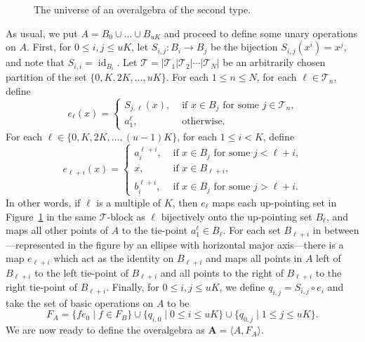 \documentclass{au}
\numberwithin{equation}{section}
\theoremstyle{plain}
\theoremstyle{definition}
\newcommand{\suchthat}{\ensuremath{\mid}}  %
\newcommand{\defeq}{\ensuremath{=}}        %
\newcommand{\<}{\ensuremath{\langle}}
\renewcommand{\>}{\ensuremath{\rangle}}
\newcommand{\bA}{\ensuremath{\mathbf{A}}}
\newcommand{\sT}{\ensuremath{\mathscr{T}}}
\DeclareMathOperator{\id}{id}
\newcommand{\supi}{\ensuremath{^{i}}}
\newcommand{\supj}{\ensuremath{^{j}}}
\renewcommand{\leq}{\ensuremath{\leqslant}}
\begin{document}
\begin{figure}[h!]
{
}
  \caption{The universe of an overalgebra of the second type.}
\label{fig:OveralgebrasIII}
\end{figure}

As usual, we put $A\defeq B_0\cup \dots\cup B_{uK}$ and proceed to define
some unary operations on $A$.
First, for $0\leq i, j \leq uK$, let $S_{i,j}\colon B_i \rightarrow B_j $ be the
bijection $S_{i,j}(x\supi)=x\supj$, and note that $S_{i,i} = \id_{B_i}$.
Let $\sT = |\sT_1|\sT_2| \cdots|\sT_N|$ be an arbitrarily chosen partition of the set
$\{0, K, 2K, \dots, uK\}$.  For each $1\leq n \leq N$, for each $\ell \in \sT_n$, define
\[
e_{\ell}(x)=
\begin{cases}
S_{j,\ell}(x), &\text{ if $x\in B_{j}$ for some $j \in \sT_n$,}\\
a^{\ell}_1, &\text{ otherwise.}
\end{cases}
\]
For each
 $\ell \in \{0, K, 2K, \dots, (u-1)K\}$, for each
$1\leq i < K$, define
\[
e_{\ell+i}(x)=
\begin{cases}
a_i^{\ell+i}, &\text{ if $x\in B_{j}$ for some $j < \ell+i$,}\\
x, &\text{ if $x\in B_{\ell+i}$,}\\
b_i^{\ell+i}, &\text{ if $x\in B_{j}$ for some $j > \ell+i$.}
\end{cases}
\]
In other words, if $\ell$ is a multiple of $K$, then $e_{\ell}$ maps each up-pointing set in
Figure~\ref{fig:OveralgebrasIII} in the same $\sT$-block  as $\ell$
bijectively onto the up-pointing set $B_{\ell}$, and maps all other points of $A$ to the tie-point
$a^{\ell}_1\in B_{\ell}$.
For each set $B_{\ell+i}$ in between---represented in the
figure by an ellipse with horizontal major axis---there is a map
$e_{\ell+i}$ which act as the identity on $B_{\ell+i}$ and maps all points in
$A$ left of $B_{\ell+i}$ to the left tie-point %
of $B_{\ell+i}$ and all points to
the right of $B_{\ell+i}$ to the right tie-point %
of $B_{\ell+i}$.
Finally, for $0\leq i, j\leq uK$, we define
$q_{i,j}=S_{i,j}\circ e_i$ and take the set of basic operations on $A$ to be
\[
F_A \defeq  \{f e_0 \suchthat f\in F_B\}  \cup \{q_{i,0} \suchthat 0\leq i \leq uK\}\cup \{q_{0,j} \suchthat 1\leq j \leq uK\}.
\]
We are now ready to define the overalgebra as $\bA \defeq  \< A, F_A\>$.
\end{document}
